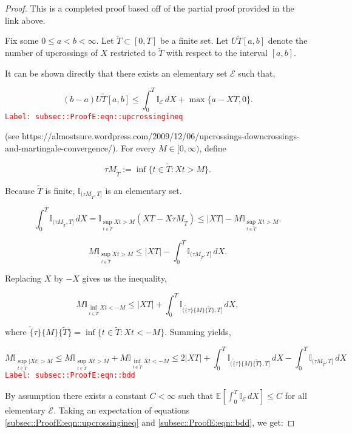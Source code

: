 \documentclass[12pt]{article}
\newcommand{\mb}{\mathbb}
\newcommand{\mc}{\mathcal}
\newcommand{\tr}{\textcolor{red}}
\newcommand{\labe}[1]{\tr{\texttt{Label: #1}}}
\newcommand{\ind}{\hspace{24pt}}
\newcommand{\ex}[1]{\mb{E}\left[#1\right]}			%
\newcommand{\T}{T}								%
\renewcommand{\t}{t}							%
\newcommand{\X}{X}								%
\newcommand{\const}{C}							%
\newcommand{\alt}[1]{\widetilde{#1}}			%
\newcommand{\rt}{\tau}							%
\newcommand{\evnt}{\mc{E}}						%
\newcommand{\Tset}{\alt{T}}						%
\newcommand{\upcrs}{U}							%
\begin{document}
\begin{proof}
This is a completed proof based off of the partial proof provided in the link above.

\ind Fix some \(0\leq a < b < \infty\). Let \(\Tset \subset [0,\T]\) be a finite set. Let \(\upcrs{\alt{\T}}[a,b]\) denote the number of upcrossings of \(\X{}{}\) restricted to \(\alt{\T}\) with respect to the interval \([a,b]\).

\ind It can be shown directly that there exists an elementary set \(\evnt{}\) such that,

\begin{equation}
(b-a)\upcrs{\Tset}[a,b] \leq \int_0^\T \mb{I}_{\evnt}\,d\X{}{} + \max\{a - \X{}{\T},0\}.
\label{subsec::ProofE:eqn::upcrossingineq}
\end{equation}
\labe{subsec::ProofE:eqn::upcrossingineq}

(see https://almostsure.wordpress.com/2009/12/06/upcrossings-downcrossings-and-martingale-convergence/). For every \(M \in [0,\infty)\), define

\[\rt{M}_{\Tset} := \inf\{\t\in \alt{\T}: \X{}{\t} > M\}.\]

Because \(\Tset\) is finite, \(\mb{I}_{(\rt{M}_{\Tset},\T]}\) is an elementary set.

\[\int_0^\T \mb{I}_{(\rt{M}_{\Tset},\T]}\,d\X{}{} = \mb{I}_{\sup_{\t\in \Tset} \X{}{\t} > M}(\X{}{\T} - \X{}{\rt{M}_{\Tset}}) \leq |\X{}{\T}| - M\mb{I}_{\sup_{\t \in \Tset} \X{}{\t} > M}.\]

\[M\mb{I}_{\sup_{\t\in\Tset} \X{}{\t} > M} \leq |\X{}{\T}| - \int_0^T \mb{I}_{(\rt{M}_{\Tset},\T]}\,d\X{}{}.\]


Replacing \(\X{}{}\) by \(-\X{}{}\) gives us the inequality,

\[M\mb{I}_{\inf_{\t\in\Tset} \X{}{\t} < -M} \leq |\X{}{\T}| + \int_0^T \mb{I}_{(\alt\{\rt\}\{M\}\{\Tset\},\T]}\,d\X{}{},\]

where \(\alt\{\rt\}\{M\}\{\Tset\} = \inf\{\t\in \Tset: \X{}{\t} < -M\}\). Summing yields,

\begin{equation}
M\mb{I}_{\sup_{\t\in\Tset}|\X{}{\t}| > M} \leq M\mb{I}_{\sup_{\t\in\Tset}\X{}{\t} > M} + M\mb{I}_{\inf_{\t\in\Tset}\X{}{\t} < -M} \leq 2|\X{}{\T}| + \int_0^\T \mb{I}_{(\alt\{\rt\}\{M\}\{\Tset\},\T]}\,d\X{}{} - \int_0^\T \mb{I}_{(\rt{M}_{\Tset},\T]}\,d\X{}{}
\label{subsec::ProofE:eqn::bdd}
\end{equation}
\labe{subsec::ProofE:eqn::bdd}

By assumption there exists a constant \(\const{} < \infty\) such that \(\ex{\int_0^\T \mb{I}_{\evnt}\,d\X{}{}} \leq \const{}\) for all elementary \(\evnt{}\). Taking an expectation of equations \eqref{subsec::ProofE:eqn::upcrossingineq} and \eqref{subsec::ProofE:eqn::bdd}, we get:


\end{proof}
\end{document}
